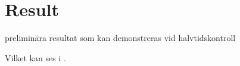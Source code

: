 \chapter{Result}\label{cha:metod}

preliminära resultat som kan demonstreras vid halvtidskontroll

 Vilket kan ses i \citep{FlemingLeang}. 
